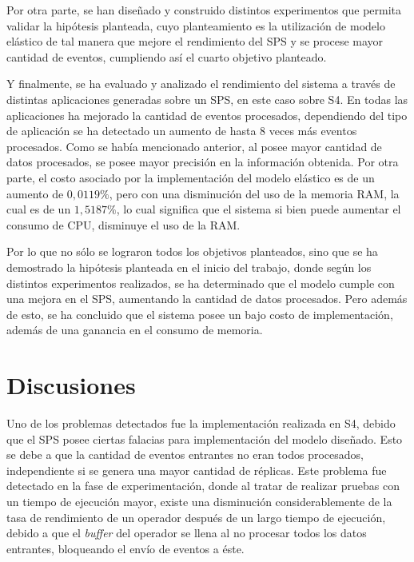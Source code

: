 Por otra parte, se han diseñado y construido distintos experimentos que permita validar la hipótesis planteada, cuyo planteamiento es la utilización de modelo elástico de tal manera que mejore el rendimiento del SPS y se procese mayor cantidad de eventos, cumpliendo así el cuarto objetivo planteado.

Y finalmente, se ha evaluado y analizado el rendimiento del sistema a través de distintas aplicaciones generadas sobre un SPS, en este caso sobre S4. En todas las aplicaciones ha mejorado la cantidad de eventos procesados, dependiendo del tipo de aplicación se ha detectado un aumento de hasta 8 veces más eventos procesados. Como se había mencionado anterior, al posee mayor cantidad de datos procesados, se posee mayor precisión en la información obtenida. Por otra parte, el costo asociado por la implementación del modelo elástico es de un aumento de $0,0119\%$, pero con una disminución del uso de la memoria RAM, la cual es de un $1,5187\%$, lo cual significa que el sistema si bien puede aumentar el consumo de CPU, disminuye el uso de la RAM.

Por lo que no sólo se lograron todos los objetivos planteados, sino que se ha demostrado la hipótesis planteada en el inicio del trabajo, donde según los distintos experimentos realizados, se ha determinado que el modelo cumple con una mejora en el SPS, aumentando la cantidad de datos procesados. Pero además de esto, se ha concluido que el sistema posee un bajo costo de implementación, además de una ganancia en el consumo de memoria.

\section{Discusiones}

Uno de los problemas detectados fue la implementación realizada en S4, debido que el SPS posee ciertas falacias para implementación del modelo diseñado. Esto se debe a que la cantidad de eventos entrantes no eran todos procesados, independiente si se genera una mayor cantidad de réplicas. Este problema fue detectado en la fase de experimentación, donde al tratar de realizar pruebas con un tiempo de ejecución mayor, existe una disminución considerablemente de la tasa de rendimiento de un operador después de un largo tiempo de ejecución, debido a que el \textit{buffer} del operador se llena al no procesar todos los datos entrantes, bloqueando el envío de eventos a éste.

